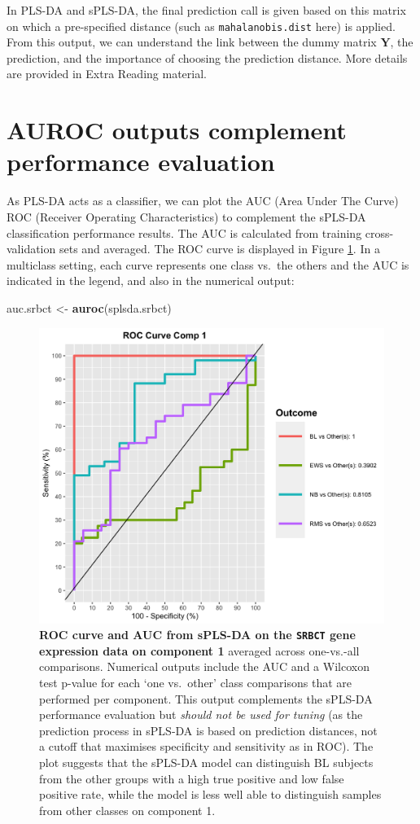 \documentclass[]{book}
\newenvironment{Shaded}{\begin{snugshade}}{\end{snugshade}}
\newcommand{\KeywordTok}[1]{\textcolor[rgb]{0.13,0.29,0.53}{\textbf{#1}}}
\newcommand{\StringTok}[1]{\textcolor[rgb]{0.31,0.60,0.02}{#1}}
\newcommand{\NormalTok}[1]{#1}
\begin{document}
In PLS-DA and sPLS-DA, the final prediction call is given based on this
matrix on which a pre-specified distance (such as
\texttt{mahalanobis.dist} here) is applied. From this output, we can
understand the link between the dummy matrix \(\boldsymbol Y\), the
prediction, and the importance of choosing the prediction distance. More
details are provided in Extra Reading material.

\section{AUROC outputs complement performance
evaluation}\label{plsda:auroc}

As PLS-DA acts as a classifier, we can plot the AUC (Area Under The
Curve) ROC (Receiver Operating Characteristics) to complement the
sPLS-DA classification performance results. The AUC is calculated from
training cross-validation sets and averaged. The ROC curve is displayed
in Figure \ref{fig:splsda-roc}. In a multiclass setting, each curve
represents one class vs.~the others and the AUC is indicated in the
legend, and also in the numerical output:

\begin{Shaded}
\begin{Highlighting}[]
\NormalTok{auc.srbct <-}\StringTok{ }\KeywordTok{auroc}\NormalTok{(splsda.srbct)}
\end{Highlighting}
\end{Shaded}

\begin{figure}

{\centering \includegraphics[width=0.5\linewidth]{Figures/PLSDA/splsda-roc-1} 

}

\caption{\textbf{ROC curve and AUC from sPLS-DA on the
\texttt{SRBCT} gene expression data on component 1} averaged across
one-vs.-all comparisons. Numerical outputs include the AUC and a
Wilcoxon test p-value for each `one vs.~other' class comparisons that
are performed per component. This output complements the sPLS-DA
performance evaluation but \emph{should not be used for tuning} (as the
prediction process in sPLS-DA is based on prediction distances, not a
cutoff that maximises specificity and sensitivity as in ROC). The plot
suggests that the sPLS-DA model can distinguish BL subjects from the
other groups with a high true positive and low false positive rate,
while the model is less well able to distinguish samples from other
classes on component 1.}\label{fig:splsda-roc}
\end{figure}
\end{document}
